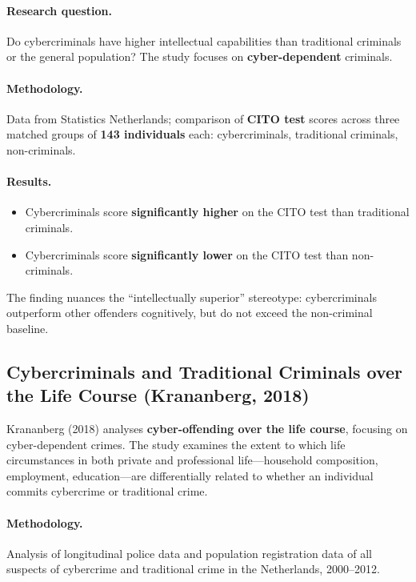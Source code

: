 \documentclass[11pt,a4paper,openany]{report}
\theoremstyle{definition}
\theoremstyle{plain}
\theoremstyle{remark}
\begin{document}
\paragraph{Research question.} Do cybercriminals have higher intellectual capabilities than traditional criminals or the general population? The study focuses on \textbf{cyber-dependent} criminals.

\paragraph{Methodology.} Data from Statistics Netherlands; comparison of \textbf{CITO test} scores across three matched groups of \textbf{143 individuals} each: cybercriminals, traditional criminals, non-criminals.

\paragraph{Results.}
\begin{itemize}
    \item Cybercriminals score \textbf{significantly higher} on the CITO test than traditional criminals.
    \item Cybercriminals score \textbf{significantly lower} on the CITO test than non-criminals.
\end{itemize}

\begin{keypoint}
The finding nuances the ``intellectually superior'' stereotype: cybercriminals outperform other offenders cognitively, but do not exceed the non-criminal baseline.
\end{keypoint}

\subsection{Cybercriminals and Traditional Criminals over the Life Course (Krananberg, 2018)}

Krananberg (2018) analyses \textbf{cyber-offending over the life course}, focusing on cyber-dependent crimes. The study examines the extent to which life circumstances in both private and professional life---household composition, employment, education---are differentially related to whether an individual commits cybercrime or traditional crime.

\paragraph{Methodology.} Analysis of longitudinal police data and population registration data of all suspects of cybercrime and traditional crime in the Netherlands, 2000--2012.
\end{document}
